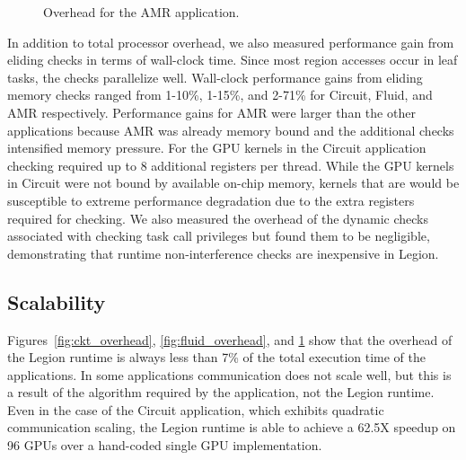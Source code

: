 \begin{figure}
\begin{center}
{\label{fig:amr16384}
}
\end{center}
\vspace{-2mm}
\caption{Overhead for the AMR application.\label{fig:amr_overhead}}
\vspace{-6mm}
\end{figure}

In addition to total processor overhead, we also measured performance gain from eliding checks in 
terms of wall-clock time.  Since most region accesses occur in leaf tasks, the checks parallelize 
well.  Wall-clock performance gains from eliding memory checks ranged from 1-10\%, 1-15\%, 
and 2-71\% for Circuit, Fluid, and AMR respectively.  Performance gains for AMR were larger than
the other applications because AMR was already memory bound and the additional checks intensified
memory pressure.  For the GPU kernels in the Circuit application checking required up to 8 additional 
registers per thread.  While the GPU kernels in Circuit were not bound by 
available on-chip memory, kernels that are would be susceptible to extreme performance 
degradation due to the extra registers required for checking.  We also measured the overhead
of the dynamic checks associated with checking task call privileges but found them to be negligible,
demonstrating that runtime non-interference checks are inexpensive in Legion.

\subsection{Scalability}
\label{subsec:scalability}

Figures~\ref{fig:ckt_overhead}, \ref{fig:fluid_overhead}, and \ref{fig:amr_overhead} show that
the overhead of the Legion runtime is always less than 7\% of the total execution time
of the applications.  In some applications communication does not scale well, but this is
a result of the algorithm required by the application, not the Legion runtime.
Even in the case of the Circuit application, which exhibits quadratic communication scaling, the Legion
runtime is able to achieve a 62.5X speedup on 96 GPUs over a hand-coded single GPU implementation\cite{Legion12}.

